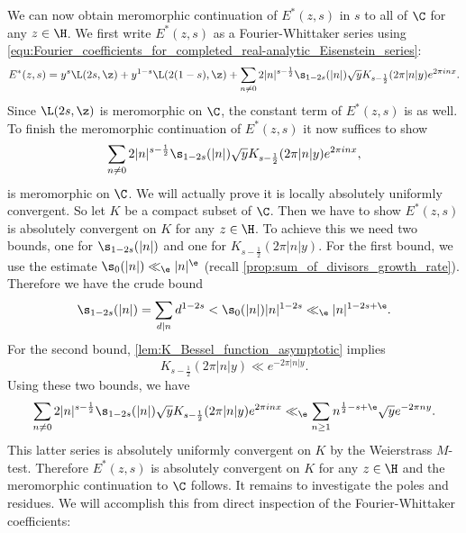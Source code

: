       We can now obtain meromorphic continuation of $E^{\ast}(z,s)$ in $s$ to all of $\C$ for any $z \in \H$. We first write $E^{\ast}(z,s)$ as a Fourier-Whittaker series using \cref{equ:Fourier_coefficients_for_completed_real-analytic_Eisenstein_series}:
      \[
        E^{\ast}(z,s) = y^{s}\L(2s,\z)+y^{1-s}\L(2(1-s),\z)+\sum_{n \neq 0}2|n|^{s-\frac{1}{2}}\s_{1-2s}(|n|)\sqrt{y}K_{s-\frac{1}{2}}(2\pi|n|y)e^{2\pi inx}.
      \]
      Since $\L(2s,\z)$ is meromorphic on $\C$, the constant term of $E^{\ast}(z,s)$ is as well. To finish the meromorphic continuation of $E^{\ast}(z,s)$ it now suffices to show
      \[
        \sum_{n \neq 0}2|n|^{s-\frac{1}{2}}\s_{1-2s}(|n|)\sqrt{y}K_{s-\frac{1}{2}}(2\pi|n|y)e^{2\pi inx},
      \]
      is meromorphic on $\C$. We will actually prove it is locally absolutely uniformly convergent. So let $K$ be a compact subset of $\C$. Then we have to show $E^{\ast}(z,s)$ is absolutely convergent on $K$ for any $z \in \H$. To achieve this we need two bounds, one for $\s_{1-2s}(|n|)$ and one for $K_{s-\frac{1}{2}}(2\pi|n|y)$. For the first bound, we use the estimate $\s_{0}(|n|) \ll_{\e} |n|^{\e}$ (recall \cref{prop:sum_of_divisors_growth_rate}). Therefore we have the crude bound
      \[
        \s_{1-2s}(|n|) = \sum_{d \mid n}d^{1-2s} < \s_{0}(|n|)|n|^{1-2s} \ll_{\e}|n|^{1-2s+\e}.
      \]
      For the second bound, \cref{lem:K_Bessel_function_asymptotic} implies
      \[
        K_{s-\frac{1}{2}}(2\pi|n|y) \ll e^{-2\pi|n|y}.
      \]
      Using these two bounds, we have
      \begin{equation}\label{equ:non-constant_Fourier_coefficient_bound_non-holomorphic_Eisenstein_series}
        \sum_{n \neq 0}2|n|^{s-\frac{1}{2}}\s_{1-2s}(|n|)\sqrt{y}K_{s-\frac{1}{2}}(2\pi|n|y)e^{2\pi inx} \ll_{\e} \sum_{n \ge 1}n^{\frac{1}{2}-s+\e}\sqrt{y}e^{-2\pi ny}.
      \end{equation}
      This latter series is absolutely uniformly convergent on $K$ by the Weierstrass $M$-test. Therefore $E^{\ast}(z,s)$ is absolutely convergent on $K$ for any $z \in \H$ and the meromorphic continuation to $\C$ follows. It remains to investigate the poles and residues. We will accomplish this from direct inspection of the Fourier-Whittaker coefficients:

